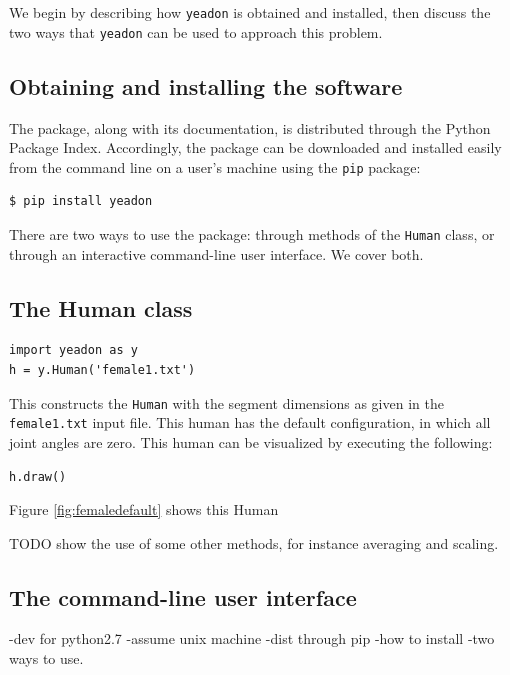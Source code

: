 \documentclass[10pt]{article}
\begin{document}
We begin by describing how \verb+yeadon+ is obtained and installed, then
discuss the two ways that \verb+yeadon+ can be used to approach this problem.

\subsection*{Obtaining and installing the software}

The package, along with its documentation, is distributed through the Python
Package Index. Accordingly, the package can be downloaded and installed easily
from the command line on a user's machine using the \verb+pip+ package:

\begin{verbatim}
$ pip install yeadon
\end{verbatim}

There are two ways to use the package: through methods of the \verb+Human+
class, or through an interactive command-line user interface. We cover both.



\subsection*{The Human class}

\begin{verbatim}
import yeadon as y
h = y.Human('female1.txt')
\end{verbatim}

This constructs the \verb+Human+ with the segment dimensions as given in the
\verb+female1.txt+ input file. This human has the default configuration, in
which all joint angles are zero. This human can be visualized by executing the
following:

\begin{verbatim}
h.draw()
\end{verbatim}

Figure \ref{fig:femaledefault} shows this Human

TODO show the use of some other methods, for instance averaging and scaling.

\subsection*{The command-line user interface}


-dev for python2.7
-assume unix machine
-dist through pip
-how to install
-two ways to use.
\end{document}
